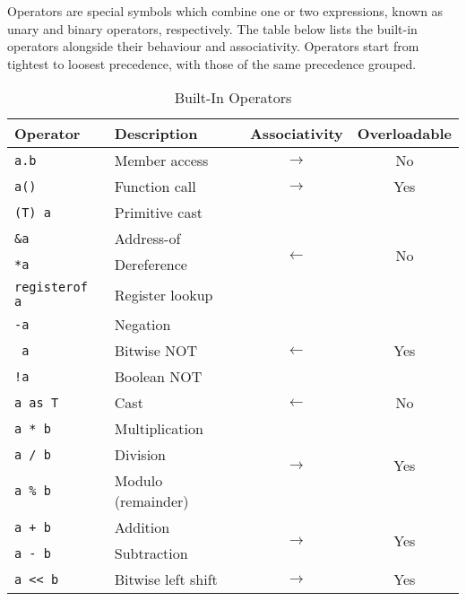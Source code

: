 \documentclass{article}
\begin{document}
    Operators are special symbols which combine one or two expressions, known as unary and binary operators, respectively.
    The table below lists the built-in operators alongside their behaviour and associativity.
    Operators start from tightest to loosest precedence, with those of the same precedence grouped.

    \begin{table}[h]
        \centering
        \caption{Built-In Operators}
        \begin{tabular}{|l|l|c|c|}
            \hline
            \textbf{Operator} & \textbf{Description} & \textbf{Associativity} & \textbf{Overloadable} \\
            \hline
            \texttt{a.b} & Member access & \(\longrightarrow\) & No \\
            \hline
            \texttt{a()} & Function call & \(\longrightarrow\) & Yes \\
            \hline
            \texttt{(T) a} & Primitive cast & \multirow{4}{*}{\(\longleftarrow\)} & \multirow{4}{*}{No} \\
            \texttt{\&a} & Address-of & & \\
            \texttt{*a} & Dereference & & \\
            \texttt{registerof a} & Register lookup & & \\
            \hline
            \texttt{-a} & Negation & \multirow{3}{*}{\(\longleftarrow\)} & \multirow{3}{*}{Yes} \\
            \texttt{~a} & Bitwise NOT & & \\
            \texttt{!a} & Boolean NOT & & \\
            \hline
            \texttt{a as T} & Cast & \(\longleftarrow\) & No \\
            \hline
            \texttt{a * b} & Multiplication & \multirow{3}{*}{\(\longrightarrow\)} & \multirow{3}{*}{Yes} \\
            \texttt{a / b} & Division & & \\
            \texttt{a \% b} & Modulo (remainder) & & \\
            \hline
            \texttt{a + b} & Addition & \multirow{2}{*}{\(\longrightarrow\)} & \multirow{2}{*}{Yes} \\
            \texttt{a - b} & Subtraction & & \\
            \hline
            \texttt{a << b} & Bitwise left shift & \multirow{2}{*}{\(\longrightarrow\)} & \multirow{2}{*}{Yes} \\

\end{tabular}
\end{table}
\end{document}

